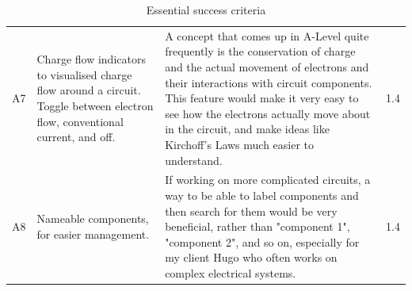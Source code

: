 \documentclass[11pt]{article}
\begin{document}
\begin{table}[!h]
\begin{tabular}{@{}lp{185pt}p{200pt}l@{}}
                A7 & Charge flow indicators to visualised charge flow around a circuit. Toggle between electron flow, conventional current, and off. & A concept that comes up in A-Level quite frequently is the conservation of charge and the actual movement of electrons and their interactions with circuit components. This feature would make it very easy to see how the electrons actually move about in the circuit, and make ideas like Kirchoff's Laws much easier to understand. & 1.4 \\ \medskip
                A8 & Nameable components, for easier management. & If working on more complicated circuits, a way to be able to label components and then search for them would be very beneficial, rather than "component 1", "component 2", and so on, especially for my client Hugo who often works on complex electrical systems. & 1.4 \\
                \bottomrule
            \end{tabular}
            \caption{Essential success criteria}
            \label{tbl:essential_succ_crit}
        \end{table}
\end{document}

